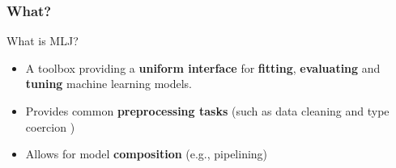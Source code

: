 \documentclass[t]{beamer}
\newcommand\df{\bf\color{Maroon}}
\begin{document}
  





\begin{frame}
  \frametitle{What?}
  \begin{block}{What is MLJ?}\pause
     \begin{itemize}
     \item A toolbox providing a {\df uniform interface} for {\df fitting}, {\df
         evaluating} and {\df tuning} machine learning models. 
          \item Provides common {\df preprocessing tasks} (such as data cleaning
            and type coercion )
          \item Allows for model {\df composition} (e.g., pipelining)
      \end{itemize}
    \end{block}
\end{frame}
\end{document}
